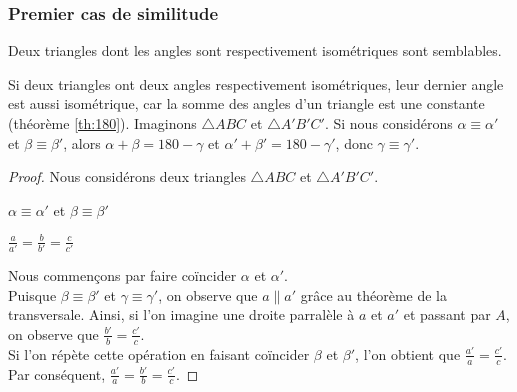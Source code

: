 \documentclass[a4paper,12pt]{article}
\begin{document}
\subsubsection{Premier cas de similitude}
\begin{theorem}
Deux triangles dont les angles sont respectivement isométriques sont semblables.
\end{theorem}

\begin{remark}
Si deux triangles ont deux angles respectivement isométriques, leur dernier angle est aussi isométrique, car la somme des angles d'un triangle est une constante (théorème \ref{th:180}). Imaginons $\triangle ABC$ et $\triangle A'B'C'$. Si nous considérons $\alpha \equiv \alpha'$ et $\beta \equiv \beta'$, alors $\alpha + \beta = 180 - \gamma$ et $\alpha' + \beta' = 180 - \gamma'$, donc $\gamma \equiv \gamma'$.

\end{remark}


\begin{proof}
Nous considérons deux triangles $\triangle ABC$ et $\triangle A'B'C'$.

\begin{hyp}
$\alpha \equiv \alpha'$ et $\beta \equiv \beta'$
\end{hyp}

\begin{concl}
$\frac{a}{a'} = \frac{b}{b'} = \frac{c}{c'}$
\end{concl}

Nous commençons par faire coïncider $\alpha$ et $\alpha '$.\\

Puisque $\beta \equiv \beta '$ et $\gamma \equiv \gamma '$, on observe que $a \parallel a'$ grâce au théorème de la transversale.
Ainsi, si l'on imagine une droite parralèle à $a$ et $a'$ et passant par $A$, on observe que $\frac{b'}{b} = \frac{c'}{c}$.\\
Si l'on répète cette opération en faisant coïncider $\beta$ et $\beta '$, l'on obtient que $\frac{a'}{a} = \frac{c'}{c}$.\\
Par conséquent, $\frac{a'}{a} = \frac{b'}{b} = \frac{c'}{c}$.


\end{proof}
\end{document}
